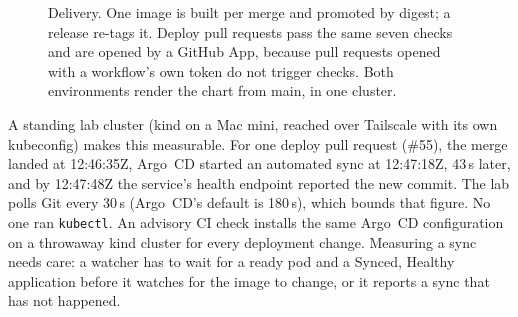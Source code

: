 \documentclass[11pt]{article}
\newcommand{\code}[1]{\texttt{#1}}
\begin{document}
\begin{figure}[t]
\centering
{}
\caption{Delivery. One image is built per merge and promoted by digest; a release re-tags it. Deploy pull requests pass the same seven checks and are opened by a GitHub App, because pull requests opened with a workflow's own token do not trigger checks. Both environments render the chart from main, in one cluster.}\label{fig:delivery}
\end{figure}

A standing lab cluster (kind on a Mac mini, reached over Tailscale with its own kubeconfig) makes this measurable. For one deploy pull request (\#55), the merge landed at 12:46:35Z, Argo~CD started an automated sync at 12:47:18Z, 43\,s later, and by 12:47:48Z the service's health endpoint reported the new commit. The lab polls Git every 30\,s (Argo~CD's default is 180\,s), which bounds that figure. No one ran \code{kubectl}. An advisory CI check installs the same Argo~CD configuration on a throwaway kind cluster for every deployment change. Measuring a sync needs care: a watcher has to wait for a ready pod and a Synced, Healthy application before it watches for the image to change, or it reports a sync that has not happened.
\end{document}
